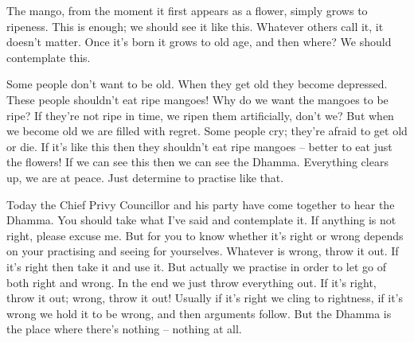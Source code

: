 The mango, from the moment it first appears as a flower, simply grows to ripeness. This is enough; we should see it like this. Whatever others call it, it doesn't matter. Once it's born it grows to old age, and then where? We should contemplate this. 

Some people don't want to be old. When they get old they become depressed. These people shouldn't eat ripe mangoes! Why do we want the mangoes to be ripe? If they're not ripe in time, we ripen them artificially, don't we? But when we become old we are filled with regret. Some people cry; they're afraid to get old or die. If it's like this then they shouldn't eat ripe mangoes -- better to eat just the flowers! If we can see this then we can see the Dhamma. Everything clears up, we are at peace. Just determine to practise like that. 

Today the Chief Privy Councillor and his party have come together to hear the Dhamma. You should take what I've said and contemplate it. If anything is not right, please excuse me. But for you to know whether it's right or wrong depends on your practising and seeing for yourselves. Whatever is wrong, throw it out. If it's right then take it and use it. But actually we practise in order to let go of both right and wrong. In the end we just throw everything out. If it's right, throw it out; wrong, throw it out! Usually if it's right we cling to rightness, if it's wrong we hold it to be wrong, and then arguments follow. But the Dhamma is the place where there's nothing -- nothing at all.
